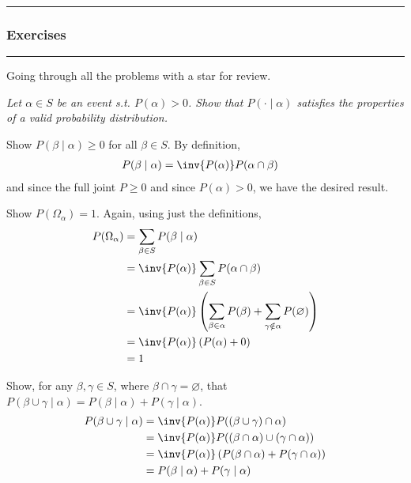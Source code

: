 \documentclass[11pt]{article}
\newcommand\subsub[1]{\Needspace{15\baselineskip}\hrule\subsubsection{#1}\hrule}
\begin{document}
\subsub{Exercises}

Going through all the problems with a star for review. \\

\begin{example}[Exercise 2.4]
	\textit{Let $\alpha \in S$ be an event s.t. $P(\alpha) > 0$. Show that $P(\cdot \mid \alpha)$ satisfies the properties of a valid probability distribution.} 
	\tcblower 
\begin{compactitem}
	\item Show $P(\beta \mid \alpha) \ge 0$ for all $\beta \in S$.  By definition,
	\begin{align}
		P(\beta \mid \alpha) &= \inv{P(\alpha)} P(\alpha \cap \beta) 
	\end{align}
	and since the full joint $P \ge 0$ and since $P(\alpha) > 0$, we have the desired result. 
	
	\item Show $P(\Omega_\alpha) = 1$. Again, using just the definitions,
	\begin{align}
		P(\Omega_{\alpha}) &= \sum_{\beta \in S} P(\beta \mid \alpha) \\
		&= \inv{P(\alpha)} \sum_{\beta \in S} P(\alpha \cap \beta) \\
		&= \inv{P(\alpha)} \left( \sum_{\beta \in \alpha} P(\beta) + \sum_{\gamma \notin \alpha} P(\varnothing)  \right) \\
		&= \inv{P(\alpha)} \left( P(\alpha) + 0 \right) \\
		&= 1
	\end{align}
	
	\item Show, for any $\beta, \gamma \in S$, where $\beta \cap \gamma = \varnothing$, that $P(\beta \cup \gamma \mid \alpha) = P(\beta \mid \alpha) + P(\gamma \mid \alpha)$. 
	\begin{align}
		P(\beta \cup \gamma \mid \alpha) 
		&= \inv{P(\alpha)} P( (\beta \cup \gamma) \cap \alpha   ) \\
		&= \inv{P(\alpha)} P( (\beta \cap \alpha) \cup (\gamma \cap \alpha) ) \\
		&= \inv{P(\alpha)} \left( P(\beta \cap \alpha) + P(\gamma \cap \alpha)  \right) \\
		&= P(\beta \mid \alpha) + P(\gamma \mid \alpha)
	\end{align}
\end{compactitem}
\end{example}
\end{document}
